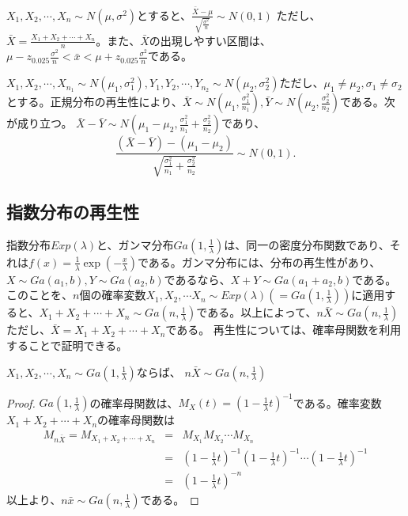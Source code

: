 \begin{theo}
    $X_1,X_2,\cdots,X_n \sim N(\mu,\sigma^2)$とすると、$\frac{\bar{X}-\mu}{\sqrt{\frac{\sigma^2}{n}}}\sim N(0,1)$ ただし、$\bar{X}=\frac{X_1+X_2+\cdots+X_n}{n}$。また、$\bar{X}$の出現しやすい区間は、$\mu-z_{0.025}\frac{\sigma^2}{n}<\bar{x}<\mu+z_{0.025}\frac{\sigma^2}{n}$である。
\end{theo}



\begin{theo}
    $X_1,X_2,\cdots,X_{n_1} \sim N(\mu_1,\sigma_1^2),Y_1,Y_2,\cdots,Y_{n_2}\sim N(\mu_2,\sigma_2^2)$ただし、$\mu_1\neq \mu_2,\sigma_1\neq \sigma_2$とする。正規分布の再生性により、$\bar{X}\sim N(\mu_1,\frac{\sigma^2_1}{n_1}),\bar{Y}\sim N(\mu_2,\frac{\sigma^2_2}{n_2})$である。次が成り立つ。
    $\bar{X}-\bar{Y} \sim N(\mu_1-\mu_2,\frac{\sigma^2_1}{n_1}+\frac{\sigma^2_2}{n_2})$であり、
    \begin{equation*}
        \frac{(\bar{X}-\bar{Y})-(\mu_1-\mu_2)}{\sqrt{\frac{\sigma_1^2}{n_1}+ \frac{\sigma_2^2}{n_2}}}\sim N(0,1).
    \end{equation*}
\end{theo}



\subsection{指数分布の再生性}
指数分布$Exp(\lambda)$と、ガンマ分布$Ga(1,\frac{1}{\lambda})$は、同一の密度分布関数であり、それは$f(x) = \frac{1}{\lambda} \exp(-\frac{x}{\lambda})$である。ガンマ分布には、分布の再生性があり、$X\sim Ga(a_1,b),Y\sim Ga(a_2,b)$であるなら、$X+Y \sim Ga(a_1+a_2,b)$である。このことを、$n$個の確率変数$X_1,X_2,\cdots X_n \sim Exp(\lambda)(=Ga(1,\frac{1}{\lambda}) )$に適用すると、$X_1+X_2+\cdots+X_n \sim Ga(n,\frac{1}{\lambda})$である。以上によって、$n\bar{X}\sim Ga(n,\frac{1}{\lambda})$ただし、$\bar{X}=X_1+X_2+\cdots+X_n$である。
再生性については、確率母関数を利用することで証明できる。

\begin{theo}
    $X_1,X_2,\cdots,X_n \sim Ga(1,\frac{1}{\lambda})$ならば、
    $n\bar{X}\sim Ga(n,\frac{1}{\lambda})$
\end{theo}

\begin{proof}
    $Ga(1,\frac{1}{\lambda})$の確率母関数は、$M_X(t)=(1-\frac{1}{\lambda}t)^{-1}$である。確率変数$X_1+X_2+\cdots+X_n$の確率母関数は
    \begin{eqnarray}
        M_{n\bar{X}} = M_{X_1+X_2+\cdots+X_n} &=& M_{X_1}M_{X_2}\cdots M_{X_n} \\
        &=& (1-\frac{1}{\lambda}t)^{-1}(1-\frac{1}{\lambda}t)^{-1}\cdots(1-\frac{1}{\lambda}t)^{-1}\\
        &=& (1-\frac{1}{\lambda}t)^{-n}
    \end{eqnarray}
    以上より、$n\bar{x}\sim Ga(n,\frac{1}{\lambda})$である。
\end{proof}

